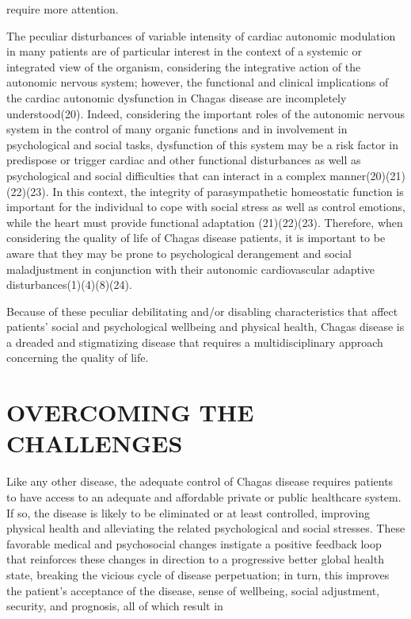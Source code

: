  require more attention. \par The peculiar disturbances of variable intensity of cardiac autonomic modulation in many
 patients are of particular interest in the context of a systemic or integrated view of
 the organism, considering the integrative action of the autonomic nervous system;
 however, the functional and clinical implications of the cardiac autonomic dysfunction
 in Chagas disease are incompletely understood(20). Indeed, considering the important roles of the autonomic nervous system in
 the control of many organic functions and in involvement in psychological and social
 tasks, dysfunction of this system may be a risk factor in predispose or trigger cardiac
 and other functional disturbances as well as psychological and social difficulties that
 can interact in a complex manner(20)(21)(22)(23). In this context, the integrity of
 parasympathetic homeostatic function is important for the individual to cope with social
 stress as well as control emotions, while the heart must provide functional adaptation
 (21)(22)(23). Therefore, when considering the quality of
 life of Chagas disease patients, it is important to be aware that they may be prone to
 psychological derangement and social maladjustment in conjunction with their autonomic
 cardiovascular adaptive disturbances(1)(4)(8)(24).\par Because of these peculiar debilitating and/or disabling characteristics that affect
 patients' social and psychological wellbeing and physical health, Chagas disease is a
 dreaded and stigmatizing disease that requires a multidisciplinary approach concerning
 the quality of life.\section*{OVERCOMING THE CHALLENGES}\par Like any other disease, the adequate control of Chagas disease requires patients to have
 access to an adequate and affordable private or public healthcare system. If so, the
 disease is likely to be eliminated or at least controlled, improving physical health and
 alleviating the related psychological and social stresses. These favorable medical and
 psychosocial changes instigate a positive feedback loop that reinforces these changes in
 direction to a progressive better global health state, breaking the vicious cycle of
 disease perpetuation; in turn, this improves the patient's acceptance of the disease,
 sense of wellbeing, social adjustment, security, and prognosis, all of which result in
